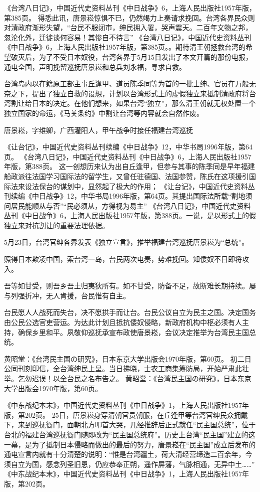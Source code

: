 \documentclass[12pt,UTF8]{ctexbook}
\begin{document}
《台湾八日记》，中国近代史资料丛刊《中日战争》6，上海人民出版社1957年版，第385页。
得悉此讯，唐景崧惊惧不已，仍然竭力上奏请求挽回。台湾各界民众则对清政府渐形失望，“台民不服闭市，绅民拥入署，哭声震天。二百年文物之邦，忽沦化外，迁徙谈何容易！其惨自不待言” 《台湾八日记》，中国近代史资料丛刊《中日战争》6，上海人民出版社1957年版，第385页。。期待清王朝拯救台湾的希望破灭后，为了不受日本奴役，台湾各界于5月15日发出了本文开篇的那份电报，通电全国，声明挽留巡抚唐景崧和总兵刘永福，寻求自救。

台湾岛内以在籍原工部主事丘逢甲、道员陈季同等为首的一批士绅、官员在万般无奈之下，提出了独立自救的设想，计划以台湾形式上的虚假独立来抵制清政府将台湾割让给日本的决定。在他们想来，如果台湾“独立”，那么清王朝就无权处置一个独立国家的命运，《马关条约》中割让台湾等内容就会自然作废。


唐景崧，字维卿，广西灌阳人，甲午战争时接任福建台湾巡抚

《让台记》，中国近代史资料丛刊续编《中日战争》12，中华书局1996年版，第64页。
《台湾八日记》，中国近代史资料丛刊《中日战争》6，上海人民出版社1957年版，第388页。
这一创想历来认为出自丘逢甲，但参与其事的陈季同是早年福建船政派往法国学习国际法的留学生，又曾任驻德国、法国参赞，陈氏在这项援引国际法来设法保台的谋划中，显然起了极大的作用； 《让台记》，中国近代史资料丛刊续编《中日战争》12，中华书局1996年版，第64页。其提出国际法所载“割地须问居民能顺从与否”“民必须从，方得视为易主” 《台湾八日记》，中国近代史资料丛刊《中日战争》6，上海人民出版社1957年版，第388页。一说，是以形式上的假独立来对抗割让的重要法理依据。

5月23日，台湾官绅各界发表《独立宣言》，推举福建台湾巡抚唐景崧为“总统”。

照得日本欺凌中国，索台湾一岛，台民两次电奏，势难挽回。知倭奴不日即将攻入。

吾等如甘受，则吾乡吾土归夷狄所有。如不甘受，防备不足，故断难长期持续。屡与列强折冲，无人肯援，台民惟有自主。

台民愿人人战死而失台，决不愿拱手而让台。台民公议自立为民主之国。决定国务由公民公选官吏营运。为达此计划且抵抗倭奴侵略，新政府机构中枢必须有人主持，确保乡里和平。夙敬仰巡抚承宣布政使唐景崧，会议决定推举为台湾民主国总统。

黄昭堂：《台湾民主国の研究》，日本东京大学出版会1970年版，第60页。
初二日公同刊刻印信，全台湾绅民上呈。当日拂晓，士农工商集筹防局，开始严肃此壮举。乞勿迟误！以全台民之名布告之。 黄昭堂：《台湾民主国の研究》，日本东京大学出版会1970年版，第60页。

《中东战纪本末》，中国近代史资料丛刊《中日战争》1，上海人民出版社1957年版，第202页。
25日，唐景崧身穿清朝官员朝服，在丘逢甲等台湾官绅民众拥戴下，来到巡抚衙门，面朝北方叩首大哭，几经推辞后正式就任“民主国总统”，位于台北的福建台湾巡抚衙门随即改为“民主国总统府”。历史上台湾“民主国”建立的这一幕，是为了抵制日本侵略而做出的最后的努力，唐景崧在“民主国”成立后发布的通电宣言内就有十分清楚的说明：“惟是台湾疆土，荷大清经营缔造二百余年，今须自立为国，感念列圣旧恩，仍应恭奉正朔，遥作屏藩，气脉相通，无异中土……” 《中东战纪本末》，中国近代史资料丛刊《中日战争》1，上海人民出版社1957年版，第202页。
\end{document}
